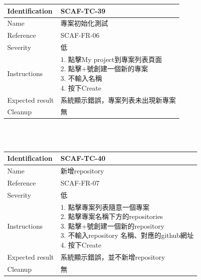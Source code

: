 \documentclass{report}
\begin{document}
\begin{tabularx}{\textwidth}{
  |p{}%
  |p{}|%
  }
  \hline
  \centering Identification &  SCAF-TC-39 \\
  \hline
  \centering Name & 專案初始化測試 \\
  \hline
  \centering Reference & SCAF-FR-06 \\
  \hline
  \centering Severity & 低 \\
  \hline
  \centering Instructions & 
  \makecell[l]{
    1. 點擊My project到專案列表頁面  \\
    2. 點擊+號創建一個新的專案  \\
    3. 不輸入名稱  \\
    4. 按下Create
  }\\
  \hline
  \centering Expected result & 系統顯示錯誤，專案列表未出現新專案 \\
  \hline
  \centering Cleanup & 無 \\
  \hline
\end{tabularx}
\\
\newline
\\
\begin{tabularx}{\textwidth}{
  |p{}%
  |p{}|%
  }
  \hline
  \centering Identification &  SCAF-TC-40 \\
  \hline
  \centering Name & 新增repository \\
  \hline
  \centering Reference & SCAF-FR-07 \\
  \hline
  \centering Severity & 低 \\
  \hline
  \centering Instructions & 
  \makecell[l]{
    1. 點擊專案列表隨意一個專案 \\
    2. 點擊專案名稱下方的repositories \\
    3. 點擊+號創建一個新的repository \\
    3. 不輸入repository 名稱、對應的github網址  \\
    4. 按下Create
  }\\
  \hline
  \centering Expected result & 系統顯示錯誤，並不新增repository \\
  \hline
  \centering Cleanup & 無 \\
  \hline
\end{tabularx}
\\
\newline
\\
\end{document}

